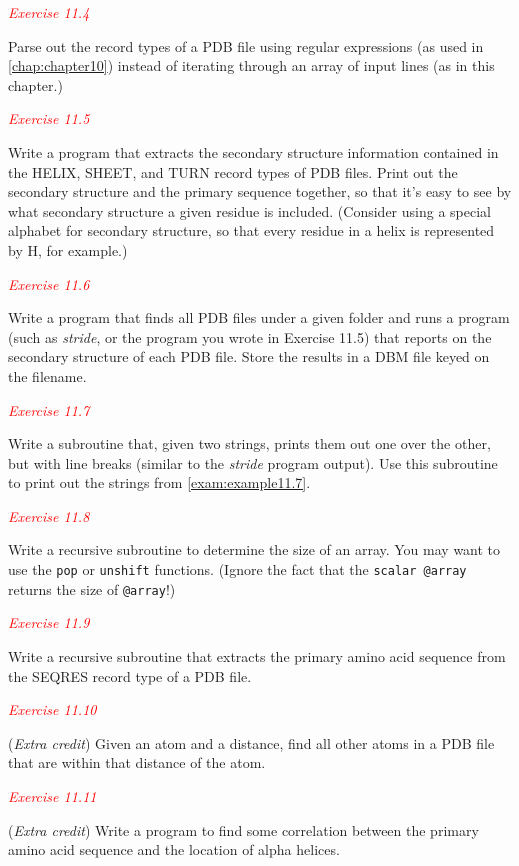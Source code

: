 \textcolor{red}{\textit{Exercise 11.4}}
\begin{adjustwidth}{1cm}{}
Parse out the record types of a PDB file using regular expressions (as used in \autoref{chap:chapter10}) instead of iterating through an array of input lines (as in this chapter.) 
\end{adjustwidth}

\textcolor{red}{\textit{Exercise 11.5}}
\begin{adjustwidth}{1cm}{}
Write a program that extracts the secondary structure information contained in the HELIX, SHEET, and TURN record types of PDB files. Print out the secondary structure and the primary sequence together, so that it's easy to see by what secondary structure a given residue is included. (Consider using a special alphabet for secondary structure, so that every residue in a helix is represented by H, for example.)
\end{adjustwidth}

\textcolor{red}{\textit{Exercise 11.6}}
\begin{adjustwidth}{1cm}{}
Write a program that finds all PDB files under a given folder and runs a program (such as \textit{stride}, or the program you wrote in Exercise 11.5) that reports on the secondary structure of each PDB file. Store the results in a DBM file keyed on the filename.
\end{adjustwidth}

\textcolor{red}{\textit{Exercise 11.7}}
\begin{adjustwidth}{1cm}{}
Write a subroutine that, given two strings, prints them out one over the other, but with line breaks (similar to the \textit{stride} program output). Use this subroutine to print out the strings from \autoref{exam:example11.7}. 
\end{adjustwidth}

\textcolor{red}{\textit{Exercise 11.8}}
\begin{adjustwidth}{1cm}{}
Write a recursive subroutine to determine the size of an array. You may want to use the \verb|pop| or \verb|unshift| functions. (Ignore the fact that the \verb|scalar @array| returns the size of \verb|@array|!)
\end{adjustwidth}

\textcolor{red}{\textit{Exercise 11.9}}
\begin{adjustwidth}{1cm}{}
Write a recursive subroutine that extracts the primary amino acid sequence from the SEQRES record type of a PDB file. 
\end{adjustwidth}

\textcolor{red}{\textit{Exercise 11.10}}
\begin{adjustwidth}{1cm}{}
(\textit{Extra credit}) Given an atom and a distance, find all other atoms in a PDB file that are within that distance of the atom. 
\end{adjustwidth}

\textcolor{red}{\textit{Exercise 11.11}}
\begin{adjustwidth}{1cm}{}
(\textit{Extra credit}) Write a program to find some correlation between the primary amino acid sequence and the location of alpha helices. 
\end{adjustwidth}

